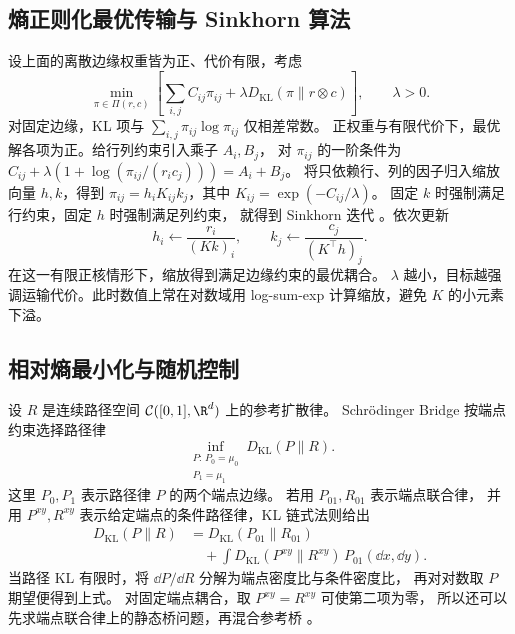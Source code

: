 \subsection{熵正则化最优传输与 Sinkhorn 算法}

设上面的离散边缘权重皆为正、代价有限，考虑
\begin{equation}
  \min_{\pi\in\Pi(r,c)}
    \left[\sum_{i,j}C_{ij}\pi_{ij}
          +\lambda D_{\mathrm{KL}}(\pi\|r\otimes c)\right],
    \qquad \lambda>0 .
  \label{eq:foundations-entropic-ot}
\end{equation}
对固定边缘，KL 项与 \(\sum_{i,j}\pi_{ij}\log\pi_{ij}\) 仅相差常数。
正权重与有限代价下，最优解各项为正。给行列约束引入乘子 \(A_i,B_j\)，
对 \(\pi_{ij}\) 的一阶条件为
\(C_{ij}+\lambda(1+\log(\pi_{ij}/(r_i c_j)))=A_i+B_j\)。
将只依赖行、列的因子归入缩放向量 \(h,k\)，得到
\(\pi_{ij}=h_iK_{ij}k_j\)，其中 \(K_{ij}=\exp(-C_{ij}/\lambda)\)。
固定 \(k\) 时强制满足行约束，固定 \(h\) 时强制满足列约束，
就得到 Sinkhorn 迭代 \cite{cuturi2013sinkhorn}。依次更新
\[
  h_i\gets\frac{r_i}{(Kk)_i},\qquad
  k_j\gets\frac{c_j}{(K^\top h)_j}.
\]
在这一有限正核情形下，缩放得到满足边缘约束的最优耦合。
\(\lambda\) 越小，目标越强调运输代价。此时数值上常在对数域用
log-sum-exp 计算缩放，避免 \(K\) 的小元素下溢。

\subsection{相对熵最小化与随机控制}

设 \(R\) 是连续路径空间 \(\mathcal C([0,1],\R^d)\) 上的参考扩散律。
Schrödinger Bridge 按端点约束选择路径律
\begin{equation}
  \inf_{\substack{P:\,P_0=\mu_0\\ P_1=\mu_1}}
     D_{\mathrm{KL}}(P\|R).
  \label{eq:foundations-sb}
\end{equation}
这里 \(P_0,P_1\) 表示路径律 \(P\) 的两个端点边缘。
若用 \(P_{01},R_{01}\) 表示端点联合律，
并用 \(P^{xy},R^{xy}\) 表示给定端点的条件路径律，KL 链式法则给出
\begin{equation}
  \begin{aligned}
    D_{\mathrm{KL}}(P\|R)
    &=D_{\mathrm{KL}}(P_{01}\|R_{01})\\
    &\quad+\int D_{\mathrm{KL}}(P^{xy}\|R^{xy})\,P_{01}(\dd x,\dd y).
  \end{aligned}
  \label{eq:foundations-sb-chain}
\end{equation}
当路径 KL 有限时，将 \(\dd P/\dd R\) 分解为端点密度比与条件密度比，
再对对数取 \(P\) 期望便得到上式。
对固定端点耦合，取 \(P^{xy}=R^{xy}\) 可使第二项为零，
所以还可以先求端点联合律上的静态桥问题，再混合参考桥
\cite{leonard2014schrodinger}。

